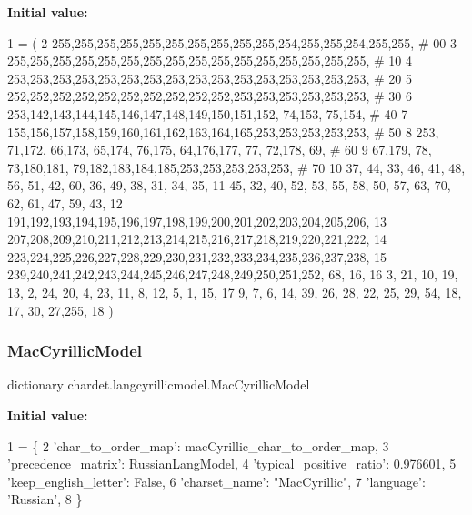 {\bfseries Initial value\+:}
\begin{DoxyCode}
1 =  (
2 255,255,255,255,255,255,255,255,255,255,254,255,255,254,255,255,  \textcolor{comment}{# 00}
3 255,255,255,255,255,255,255,255,255,255,255,255,255,255,255,255,  \textcolor{comment}{# 10}
4 253,253,253,253,253,253,253,253,253,253,253,253,253,253,253,253,  \textcolor{comment}{# 20}
5 252,252,252,252,252,252,252,252,252,252,253,253,253,253,253,253,  \textcolor{comment}{# 30}
6 253,142,143,144,145,146,147,148,149,150,151,152, 74,153, 75,154,  \textcolor{comment}{# 40}
7 155,156,157,158,159,160,161,162,163,164,165,253,253,253,253,253,  \textcolor{comment}{# 50}
8 253, 71,172, 66,173, 65,174, 76,175, 64,176,177, 77, 72,178, 69,  \textcolor{comment}{# 60}
9  67,179, 78, 73,180,181, 79,182,183,184,185,253,253,253,253,253,  \textcolor{comment}{# 70}
10  37, 44, 33, 46, 41, 48, 56, 51, 42, 60, 36, 49, 38, 31, 34, 35,
11  45, 32, 40, 52, 53, 55, 58, 50, 57, 63, 70, 62, 61, 47, 59, 43,
12 191,192,193,194,195,196,197,198,199,200,201,202,203,204,205,206,
13 207,208,209,210,211,212,213,214,215,216,217,218,219,220,221,222,
14 223,224,225,226,227,228,229,230,231,232,233,234,235,236,237,238,
15 239,240,241,242,243,244,245,246,247,248,249,250,251,252, 68, 16,
16   3, 21, 10, 19, 13,  2, 24, 20,  4, 23, 11,  8, 12,  5,  1, 15,
17   9,  7,  6, 14, 39, 26, 28, 22, 25, 29, 54, 18, 17, 30, 27,255,
18 )
\end{DoxyCode}
\mbox{\label{namespacechardet_1_1langcyrillicmodel_ab223264a9ea93673d09a09421bda429d}} 
\subsubsection{\texorpdfstring{Mac\+Cyrillic\+Model}{MacCyrillicModel}}
{\footnotesize\ttfamily dictionary chardet.\+langcyrillicmodel.\+Mac\+Cyrillic\+Model}

{\bfseries Initial value\+:}
\begin{DoxyCode}
1 =  \{
2   \textcolor{stringliteral}{'char\_to\_order\_map'}: macCyrillic\_char\_to\_order\_map,
3   \textcolor{stringliteral}{'precedence\_matrix'}: RussianLangModel,
4   \textcolor{stringliteral}{'typical\_positive\_ratio'}: 0.976601,
5   \textcolor{stringliteral}{'keep\_english\_letter'}: \textcolor{keyword}{False},
6   \textcolor{stringliteral}{'charset\_name'}: \textcolor{stringliteral}{"MacCyrillic"},
7   \textcolor{stringliteral}{'language'}: \textcolor{stringliteral}{'Russian'},
8 \}
\end{DoxyCode}
\mbox{\label{namespacechardet_1_1langcyrillicmodel_ab72832d91cf9cb099e76fd3ea13d2dc6}} 
